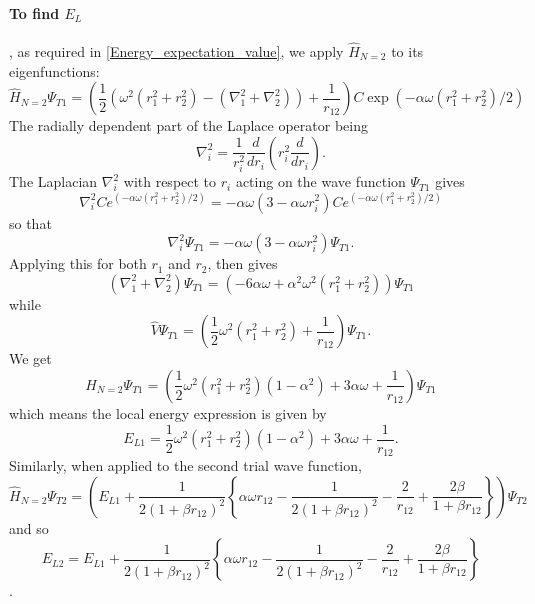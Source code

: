 \documentclass[10pt,a4paper]{article}
\begin{document}
\paragraph{To find $E_L$}, as required in \eqref{Energy_expectation_value}, we apply $\hat{H}_{N=2}$ to its eigenfunctions:
\begin{equation*}
\hat{H}_{N=2}\Psi_{T1} = \left( \frac{1}{2}\left( \omega^2   \left( r_1^2+r_2^2 \right)-\left( \nabla_1^2 + \nabla_2^2 \right)  \right)+\frac{1}{r_{12}} \right)C\exp{\left(-\alpha\omega(r_1^2+r_2^2)/2\right)}
\end{equation*}
The radially dependent part of the Laplace operator being
\begin{equation}
\nabla_i^2 = \frac{1}{r_i^2}\frac{d}{dr_i}\left( r_i^2 \frac{d}{dr_i} \right).
\end{equation}
The Laplacian $\nabla_i^2$ with respect to $r_i$ acting on the wave function $\Psi_{T1}$ gives
\begin{equation}
\nabla_i^2Ce^{\left(-\alpha\omega(r_1^2+r_2^2)/2\right)} = -\alpha\omega \left( 3 -\alpha \omega r_i^2 \right)Ce^{\left(-\alpha\omega(r_1^2+r_2^2)/2\right)}
\end{equation}
so that 
\begin{equation}
\nabla_i^2\Psi_{T1} = -\alpha\omega \left( 3 -\alpha \omega r_i^2 \right)\Psi_{T1}.
\end{equation}
Applying this for both $r_1$ and $r_2$, then gives
\begin{equation}
\left( \nabla_1^2 + \nabla_2^2 \right)\Psi_{T1} = \left( -6\alpha \omega+\alpha^2\omega^2\left( r_1^2+r_2^2 \right) \right)\Psi_{T1}
\end{equation}
while 
\begin{equation}
\hat{V}\Psi_{T1} = \left( \frac{1}{2} \omega^2   \left( r_1^2+r_2^2 \right) +\frac{1}{r_{12}} \right)\Psi_{T1}.
\end{equation}
We get
\begin{equation}
\hat{H}_{N=2}\Psi_{T1} = \left( \frac{1}{2}\omega^2\left( r_1^2+r_2^2\right)\left(1-\alpha^2\right) +3\alpha\omega+\frac{1}{r_{12}} \right)\Psi_{T1}
\end{equation}
which means the local energy expression is given by
\begin{equation}
E_{L1} =  \frac{1}{2}\omega^2\left( r_1^2+r_2^2\right)\left(1-\alpha^2\right) +3\alpha\omega+\frac{1}{r_{12}}.
\end{equation}
Similarly, when applied to the second trial wave function,
\begin{equation*}
\hat{H}_{N=2}\Psi_{T2} = \left( E_{L1}+\frac{1}{2(1+\beta r_{12})^2}\left\{\alpha\omega r_{12}-\frac{1}{2(1+\beta r_{12})^2}-\frac{2}{r_{12}}+\frac{2\beta}{1+\beta r_{12}}\right\} \right)\Psi_{T2}
\end{equation*}
and so 
\begin{equation}
E_{L2} = E_{L1}+\frac{1}{2(1+\beta r_{12})^2}\left\{\alpha\omega r_{12}-\frac{1}{2(1+\beta r_{12})^2}-\frac{2}{r_{12}}+\frac{2\beta}{1+\beta r_{12}}\right\}
\end{equation}
\cite{Problem_set_5}.
\end{document}
